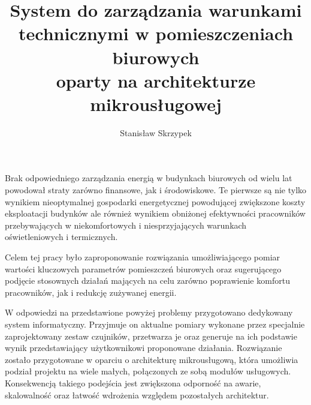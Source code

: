 \documentclass[
    left=2.5cm,         %
    right=2.5cm,        %
    top=2.5cm,          %
    bottom=3cm,         %
    bindingoffset=6mm,  %
    nohyphenation=false %
]{eiti/eiti-thesis}
\begin{document}
\EngineerThesis %
{}
\title{
    System do zarządzania warunkami \\
    technicznymi w pomieszczeniach biurowych \\
    oparty na architekturze mikrousługowej
}
\author{Stanisław Skrzypek}
\date{\the\year}
\maketitle

\cleardoublepage %
\streszczenie 
Brak odpowiedniego zarządzania energią w budynkach biurowych od wielu lat 
powodował straty zarówno finansowe, jak i środowiskowe. Te pierwsze są nie 
tylko wynikiem nieoptymalnej gospodarki energetycznej powodującej zwiększone
koszty eksploatacji budynków ale również wynikiem obniżonej efektywności
pracowników przebywających w niekomfortowych i niesprzyjających warunkach
oświetleniowych i termicznych. 

Celem tej pracy było 
zaproponowanie rozwiązania umożliwiającego pomiar wartości 
kluczowych parametrów pomieszczeń biurowych oraz sugerującego podjęcie stosownych 
działań mających na celu zarówno poprawienie komfortu pracowników, jak i 
redukcję zużywanej energii. 

W odpowiedzi na przedstawione powyżej problemy przygotowano dedykowany 
system informatyczny. Przyjmuje on aktualne pomiary wykonane
przez specjalnie zaprojektowany zestaw czujników, przetwarza je oraz generuje 
na ich podstawie wynik przedstawiający użytkownikowi proponowane działania.
Rozwiązanie zostało przygotowane w oparciu o architekturę mikrousługową, która
umożliwia podział projektu na wiele małych, połączonych ze sobą modułów usługowych.
Konsekwencją takiego podejścia jest zwiększona odporność na awarie, skalowalność
oraz łatwość wdrożenia względem pozostałych architektur.
\end{document}
